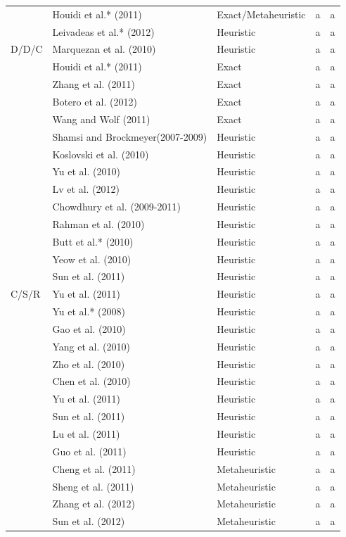 \begin{longtable}{lllll}
 & Houidi et al.* (2011)  & Exact/Metaheuristic & a & a\\
 & Leivadeas et al.* (2012)  & Heuristic & a & a\\
\hline
\multirow{1}{*}{D/D/C} & Marquezan et al. (2010)  & Heuristic  & a& a\\
\hline
\multirow{31}{*}{C/S/R} & Houidi et al.* (2011)  & Exact & a& a\\
 & Zhang et al. (2011)  & Exact & a & a\\
 & Botero et al. (2012)  & Exact & a & a\\
 & Wang and Wolf (2011)  & Exact & a & a\\
 & Shamsi and Brockmeyer(2007-2009)  & Heuristic & a & a\\
 & Koslovski et al. (2010)  & Heuristic & a & a\\
 & Yu et al. (2010)  & Heuristic & a & a\\
 & Lv et al. (2012)  & Heuristic & a & a\\
 & Chowdhury et al. (2009-2011)  & Heuristic & a & a\\
 & Rahman et al. (2010)  & Heuristic & a & a\\
 & Butt et al.* (2010)  & Heuristic & a & a\\
 & Yeow et al. (2010)  & Heuristic & a & a\\
 & Sun et al. (2011)  & Heuristic & a & a\\
 & Yu et al. (2011)  & Heuristic & a & a\\
 & Yu et al.* (2008)  & Heuristic & a & a\\
 & Gao et al. (2010)  & Heuristic & a & a\\
 & Yang et al. (2010)  & Heuristic & a & a\\
 & Zho et al. (2010)  & Heuristic & a & a\\
 & Chen et al. (2010)  & Heuristic & a & a\\
 & Yu et al. (2011)  & Heuristic & a & a\\
 & Sun et al. (2011)  & Heuristic & a & a\\
 & Lu et al. (2011)  & Heuristic & a & a\\
 & Guo et al. (2011)  & Heuristic & a & a\\
 & Cheng et al. (2011)  & Metaheuristic & a & a\\
 & Sheng et al. (2011)  & Metaheuristic & a & a\\
 & Zhang et al. (2012)  & Metaheuristic & a & a\\
 & Sun et al. (2012)  & Metaheuristic & a & a\\

\end{longtable}
